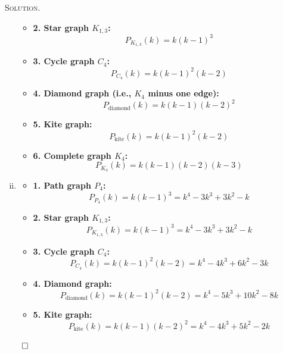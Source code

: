 \documentclass[12pt, a4paper, oneside]{ctexart}
\newenvironment{solution}{%
	\par\noindent\textsc{Solution. }\ignorespaces
}{%
	\hfill$\qed$\par
}
\begin{document}
\begin{solution}
\begin{enumerate}[(i)]
\begin{itemize}
                    \item \textbf{2. Star graph $K_{1,3}$:}
                    \[
                    P_{K_{1,3}}(k) = k(k - 1)^3
                    \]
                  
                    \item \textbf{3. Cycle graph $C_4$:}
                    \[
                    P_{C_4}(k) = k(k - 1)^2(k - 2)
                    \]
                  
                    \item \textbf{4. Diamond graph (i.e., $K_4$ minus one edge):}
                    \[
                    P_{\text{diamond}}(k) = k(k - 1)(k - 2)^2
                    \]
                  
                    \item \textbf{5. Kite graph:}
                    \[
                    P_{\text{kite}}(k) = k(k - 1)^2(k - 2)
                    \]
                  
                    \item \textbf{6. Complete graph $K_4$:}
                    \[
                    P_{K_4}(k) = k(k - 1)(k - 2)(k - 3)
                    \]
                  \end{itemize}
            \item \begin{itemize}
                \item \textbf{1. Path graph $P_4$:}
                \[
                P_{P_4}(k) = k(k - 1)^3 = k^4 - 3k^3 + 3k^2 - k
                \]
              
                \item \textbf{2. Star graph $K_{1,3}$:}
                \[
                P_{K_{1,3}}(k) = k(k - 1)^3 = k^4 - 3k^3 + 3k^2 - k
                \]
              
                \item \textbf{3. Cycle graph $C_4$:}
                \[
                P_{C_4}(k) = k(k - 1)^2(k - 2) = k^4 - 4k^3 + 6k^2 - 3k
                \]
              
                \item \textbf{4. Diamond graph:}
                \[
                P_{\text{diamond}}(k) = k(k - 1)^2(k - 2) = k^4 - 5k^3 + 10k^2 - 8k
                \]
              
                \item \textbf{5. Kite graph:}
                \[
                P_{\text{kite}}(k) = k(k - 1)(k - 2)^2 = k^4 - 4k^3 + 5k^2 - 2k
                \]
              

\end{itemize}
\end{enumerate}
\end{solution}
\end{document}
